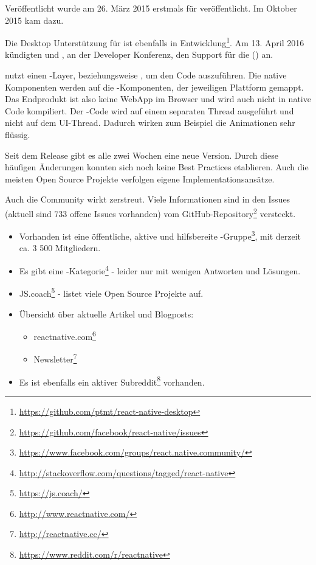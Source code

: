 Veröffentlicht wurde  am 26. März 2015 erstmals für  veröffentlicht.
Im Oktober 2015 kam  dazu.\cite{react-native-release}

Die Desktop Unterstützung für  ist ebenfalls in Entwicklung\footnote{\url{https://github.com/ptmt/react-native-desktop}}. 
Am 13. April 2016 kündigten  und , an der  Developer Konferenz, den Support für die  () an\cite{react-native-windows}. 

 nutzt einen -Layer, beziehungsweise , um den Code auszuführen.\cite{react-native-javascriptcore} 
Die native Komponenten werden auf die -Komponenten, der jeweiligen Plattform gemappt. 
Das Endprodukt ist also keine \gls{WebApp} im Browser und wird auch nicht in native Code kompiliert. 
Der -Code wird auf einem separaten Thread ausgeführt und nicht auf dem UI-Thread. 
Dadurch wirken zum Beispiel die Animationen sehr flüssig.\cite{react-native-javascript-thread}



Seit dem Release gibt es alle zwei Wochen eine neue Version. 
Durch diese häufigen Änderungen konnten sich noch keine Best Practices etablieren. 
Auch die meisten Open Source Projekte verfolgen eigene Implementationsansätze.

Auch die Community wirkt zerstreut. 
Viele Informationen sind in den Issues (aktuell sind 733 offene Issues vorhanden) vom  GitHub-Repository\footnote{\url{https://github.com/facebook/react-native/issues}}  versteckt.

\begin{itemize}
	\item Vorhanden ist eine öffentliche, aktive und hilfsbereite -Gruppe\footnote{\url{https://www.facebook.com/groups/react.native.community/}}, mit derzeit ca. 3 500 Mitgliedern.
	\item Es gibt eine -Kategorie\footnote{\url{http://stackoverflow.com/questions/tagged/react-native}} - leider nur mit wenigen Antworten und Lösungen.
	\item JS.coach\footnote{\url{https://js.coach/}} - listet viele Open Source Projekte auf.
	\item Übersicht über aktuelle Artikel und Blogposts: 
	\begin{itemize}
		\item reactnative.com\footnote{\url{http://www.reactnative.com/}}
		\item {} Newsletter\footnote{\url{http://reactnative.cc/}}
	\end{itemize}
	\item Es ist ebenfalls ein aktiver Subreddit\footnote{\url{https://www.reddit.com/r/reactnative}} vorhanden.
\end{itemize}



